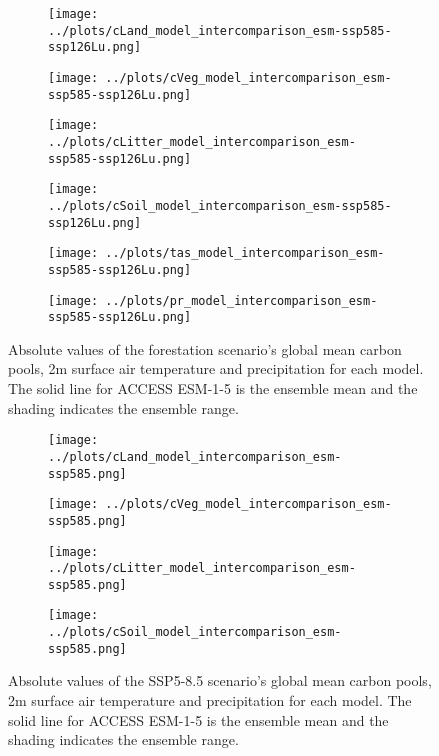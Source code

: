 \documentclass[]{article}
\begin{document}
\begin{figure}[H]
    \centering
    \begin{subfigure}[b]{0.45\linewidth}
        \texttt{[image: ../plots/cLand\_model\_intercomparison\_esm-ssp585-ssp126Lu.png]}
    \end{subfigure}
    \begin{subfigure}[b]{0.45\linewidth}
        \texttt{[image: ../plots/cVeg\_model\_intercomparison\_esm-ssp585-ssp126Lu.png]}
    \end{subfigure}
    \begin{subfigure}[b]{0.45\linewidth}
        \texttt{[image: ../plots/cLitter\_model\_intercomparison\_esm-ssp585-ssp126Lu.png]}
    \end{subfigure}
    \begin{subfigure}[b]{0.45\linewidth}
        \texttt{[image: ../plots/cSoil\_model\_intercomparison\_esm-ssp585-ssp126Lu.png]}
    \end{subfigure}
    \begin{subfigure}[b]{0.45\linewidth}
        \texttt{[image: ../plots/tas\_model\_intercomparison\_esm-ssp585-ssp126Lu.png]}
    \end{subfigure}
    \begin{subfigure}[b]{0.45\linewidth}
        \texttt{[image: ../plots/pr\_model\_intercomparison\_esm-ssp585-ssp126Lu.png]}
    \end{subfigure}
    \caption{Absolute values of the forestation scenario's global mean carbon pools, 2m surface air temperature and precipitation for each model. The solid line for ACCESS ESM-1-5 is the ensemble mean and the shading indicates the ensemble range.}
    \label{fig:models_absolute}
\end{figure}

\begin{figure}[H]
    \centering
    \begin{subfigure}[b]{0.45\linewidth}
        \texttt{[image: ../plots/cLand\_model\_intercomparison\_esm-ssp585.png]}
    \end{subfigure}
    \begin{subfigure}[b]{0.45\linewidth}
        \texttt{[image: ../plots/cVeg\_model\_intercomparison\_esm-ssp585.png]}
    \end{subfigure}
    \begin{subfigure}[b]{0.45\linewidth}
        \texttt{[image: ../plots/cLitter\_model\_intercomparison\_esm-ssp585.png]}
    \end{subfigure}
    \begin{subfigure}[b]{0.45\linewidth}
        \texttt{[image: ../plots/cSoil\_model\_intercomparison\_esm-ssp585.png]}
    \end{subfigure}
    \caption{Absolute values of the SSP5-8.5 scenario's global mean carbon pools, 2m surface air temperature and precipitation for each model. The solid line for ACCESS ESM-1-5 is the ensemble mean and the shading indicates the ensemble range.}
    \label{fig:models_absolute2}
\end{figure}
\end{document}
